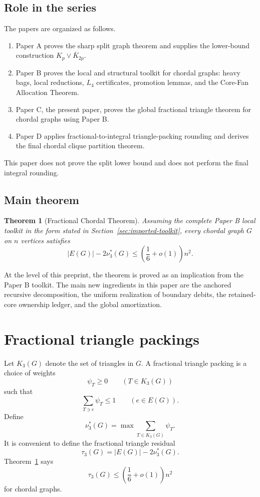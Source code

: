 \documentclass[11pt]{article}
\newtheorem{theorem}{Theorem}[section]
\theoremstyle{definition}
\begin{document}
\subsection*{Role in the series}

The papers are organized as follows.

\begin{enumerate}[label=(\Alph*)]
    \item Paper A proves the sharp split graph theorem and supplies the lower-bound construction \(K_p\vee\overline{K}_{2p}\).
    \item Paper B proves the local and structural toolkit for chordal graphs: heavy bags, local reductions, \(L_4\) certificates, promotion lemmas, and the Core-Fan Allocation Theorem.
    \item Paper C, the present paper, proves the global fractional triangle theorem for chordal graphs using Paper B.
    \item Paper D applies fractional-to-integral triangle-packing rounding and derives the final chordal clique partition theorem.
\end{enumerate}

This paper does not prove the split lower bound and does not perform the final integral rounding.

\subsection*{Main theorem}

\begin{theorem}[Fractional Chordal Theorem]\label{thm:fractional-main}
Assuming the complete Paper B local toolkit in the form stated in Section~\ref{sec:imported-toolkit}, every chordal graph \(G\) on \(n\) vertices satisfies
\[
    |E(G)|-2\nu_3^*(G)
    \le
    \left(\frac16+o(1)\right)n^2.
\]
\end{theorem}

At the level of this preprint, the theorem is proved as an implication from the Paper B toolkit. The main new ingredients in this paper are the anchored recursive decomposition, the uniform realization of boundary debits, the retained-core ownership ledger, and the global amortization.

\section{Fractional triangle packings}

Let \(K_3(G)\) denote the set of triangles in \(G\). A fractional triangle packing is a choice of weights
\[
    \psi_T\ge0
    \qquad
    (T\in K_3(G))
\]
such that
\[
    \sum_{T\ni e}\psi_T\le1
    \qquad
    (e\in E(G)).
\]
Define
\[
    \nu_3^*(G)=
    \max\sum_{T\in K_3(G)}\psi_T.
\]
It is convenient to define the fractional triangle residual
\[
    \tau_3(G)=|E(G)|-2\nu_3^*(G).
\]
Theorem~\ref{thm:fractional-main} says
\[
    \tau_3(G)\le \left(\frac16+o(1)\right)n^2
\]
for chordal graphs.
\end{document}
